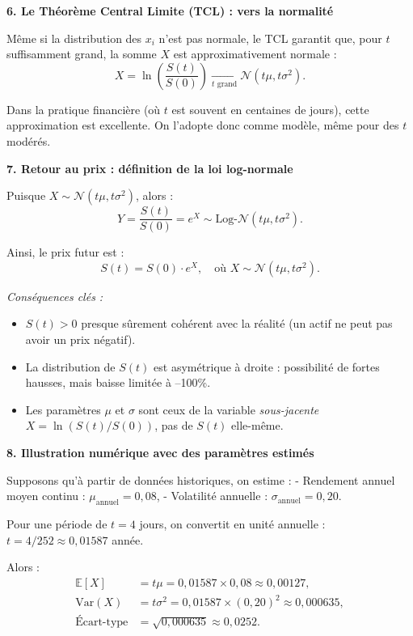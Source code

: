 \begin{examplebox}
\medskip
\noindent \textbf{6. Le Théorème Central Limite (TCL) : vers la normalité}

Même si la distribution des \( x_i \) n’est pas normale, le TCL garantit que, pour \( t \) suffisamment grand, la somme \( X \) est approximativement normale :
\[
X = \ln\left( \frac{S(t)}{S(0)} \right) \xrightarrow[t \text{ grand}]{} \mathcal{N}(t\mu, t\sigma^2).
\]

Dans la pratique financière (où \( t \) est souvent en centaines de jours), cette approximation est excellente. On l’adopte donc comme modèle, même pour des \( t \) modérés.

\medskip
\noindent \textbf{7. Retour au prix : définition de la loi log-normale}

Puisque \( X \sim \mathcal{N}(t\mu, t\sigma^2) \), alors :
\[
Y = \frac{S(t)}{S(0)} = e^X \sim \text{Log-}\mathcal{N}(t\mu, t\sigma^2).
\]

Ainsi, le prix futur est :
\[
S(t) = S(0) \cdot e^{X}, \quad \text{où } X \sim \mathcal{N}(t\mu, t\sigma^2).
\]

 \textit{Conséquences clés :}
 \begin{itemize}
     \item \( S(t) > 0 \) presque sûrement cohérent avec la réalité (un actif ne peut pas avoir un prix négatif).
     \item La distribution de \( S(t) \) est asymétrique à droite : possibilité de fortes hausses, mais baisse limitée à –100\%.
     \item Les paramètres \( \mu \) et \( \sigma \) sont ceux de la variable \textit{sous-jacente} \( X = \ln(S(t)/S(0)) \), pas de \( S(t) \) elle-même.
 \end{itemize}

\medskip
\noindent \textbf{8. Illustration numérique avec des paramètres estimés}

Supposons qu’à partir de données historiques, on estime :
- Rendement annuel moyen continu : \( \mu_{\text{annuel}} = 0{,}08 \),
- Volatilité annuelle : \( \sigma_{\text{annuel}} = 0{,}20 \).

Pour une période de \( t = 4 \) jours, on convertit en unité annuelle : \( t = 4/252 \approx 0{,}01587 \) année.

Alors :
\[
\begin{aligned}
\mathbb{E}[X] &= t \mu = 0{,}01587 \times 0{,}08 \approx 0{,}00127, \\
\text{Var}(X) &= t \sigma^2 = 0{,}01587 \times (0{,}20)^2 \approx 0{,}000635, \\
\text{Écart-type} &= \sqrt{0{,}000635} \approx 0{,}0252.
\end{aligned}
\]


\end{examplebox}
